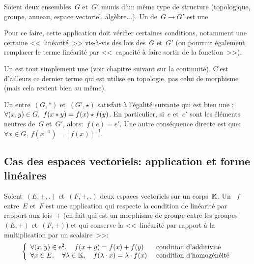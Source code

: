 \medskip
Soient deux ensembles~$G$ et~$G'$ munis d'un même type de
structure (topologique, groupe,
anneau, espace vectoriel, algèbre...).
Un  de~$G \to G'$ est une

Pour ce faire, cette application doit vérifier certaines conditions, notamment une
certaine <<~linéarité~>> vis-à-vis des lois des~$G$ et~$G'$
(on pourrait également remplacer le terme linéarité par <<~capacité à faire
sortir de la fonction~>>).

\medskip
Un  est tout simplement
une  (voir chapitre suivant sur la continuité).
C'est d'ailleurs ce dernier terme qui est utilisé en topologie, pas celui de morphisme (mais cela
revient bien au même).

\medskip
Un  entre~$(G,*)$ et~$(G',\star)$ satisfait à l'égalité suivante
qui est bien une :
$\colorred
\forall (x,y)\in G,\ f(x*y)=f(x)\star f(y)
$.
En particulier, si~$e$ et~$e'$ sont les éléments neutres de~$G$ et~$G'$, alors:~$f(e)=e'$.
Une autre conséquence directe est que:~$\forall x \in G,\ f(x^{-1})=[f(x)]^{-1}$.

\medskip
\subsection{Cas des espaces vectoriels: application et forme linéaires}

\begin{definition}[Morphisme d'ev]
Soient~$(E,+,.)$ et~$(F,+,.)$ deux espaces vectoriels sur un corps~$\mathbb K$.
Un ~$f$ entre~$E$ et~$F$ est une application qui respecte la condition
de linéarité par rapport aux lois~$+$ (en fait qui est un morphisme
de groupe entre les groupes~$(E,+)$ et~$(F,+)$) et qui conserve la
<<~linéarité par rapport à la multiplication par un scalaire~>>:
\begin{equation}\left\{
\begin{array}{ll}
\forall (x,y)\in \mathrm{e}^2, \quad f(x+ y)=f(x)+ f(y) &\text{ condition d'additivité}\\
\forall x\in E,\quad \forall \lambda\in\mathbb K,\quad f(\lambda\cdot x)=\lambda\cdot f(x) &\text{ condition d'homogénéité}
\end{array}
\right.\end{equation}
\end{definition}

